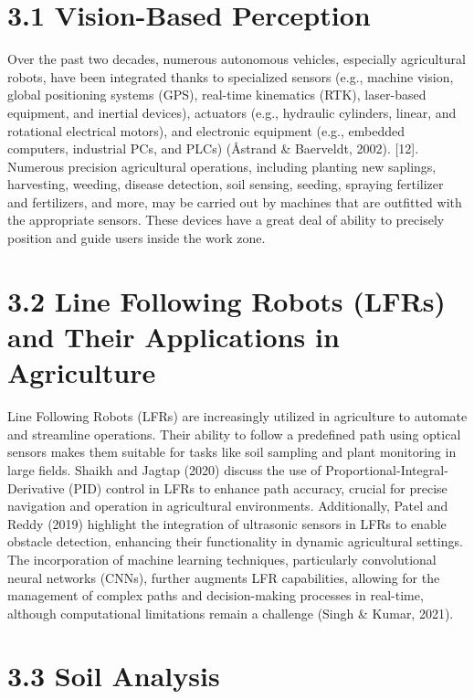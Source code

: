 \documentclass{book} %
\begin{document}
\section{3.1 Vision-Based Perception}

\noindent Over the past two decades, numerous autonomous vehicles, especially agricultural robots, have been integrated thanks to specialized sensors (e.g., machine vision, global positioning systems (GPS), real-time kinematics (RTK), laser-based equipment, and inertial devices), actuators (e.g., hydraulic cylinders, linear, and rotational electrical motors), and electronic equipment (e.g., embedded computers, industrial PCs, and PLCs) ({\AA}strand \& Baerveldt, 2002). [12]. Numerous precision agricultural operations, including planting new saplings, harvesting, weeding, disease detection, soil sensing, seeding, spraying fertilizer and fertilizers, and more, may be carried out by machines that are outfitted with the appropriate sensors. These devices have a great deal of ability to precisely position and guide users inside the work zone.

\noindent 
\section{3.2 Line Following Robots (LFRs) and Their Applications in Agriculture}

\noindent Line Following Robots (LFRs) are increasingly utilized in agriculture to automate and streamline operations. Their ability to follow a predefined path using optical sensors makes them suitable for tasks like soil sampling and plant monitoring in large fields. Shaikh and Jagtap (2020) discuss the use of Proportional-Integral-Derivative (PID) control in LFRs to enhance path accuracy, crucial for precise navigation and operation in agricultural environments. Additionally, Patel and Reddy (2019) highlight the integration of ultrasonic sensors in LFRs to enable obstacle detection, enhancing their functionality in dynamic agricultural settings. The incorporation of machine learning techniques, particularly convolutional neural networks (CNNs), further augments LFR capabilities, allowing for the management of complex paths and decision-making processes in real-time, although computational limitations remain a challenge (Singh \& Kumar, 2021).

\noindent 
\section{3.3 Soil Analysis }
\end{document}
